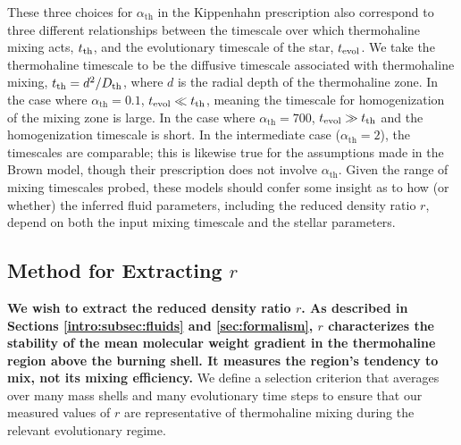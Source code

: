 These three choices for $\alpha_{\text{th}}$ in the Kippenhahn prescription also correspond to three different relationships between the timescale over which thermohaline mixing acts, $t_{\rm th}$, and the evolutionary timescale of the star, $t_{\rm{evol}}$. 
We take the thermohaline timescale to be the diffusive timescale associated with thermohaline mixing, $t_{\rm th} = d^2/D_{\rm th}$, where $d$ is the radial depth of the thermohaline zone.
In the case where $\alpha_{\text{th}} = 0.1$, 
$t_{\rm evol} \ll t_{\rm th}$, meaning the timescale for homogenization of the mixing zone is large. In the case where $\alpha_{\text{th}} = 700$, 
$t_{\rm evol} \gg t_{\rm th}$ and the homogenization timescale is short. In the intermediate case ($\alpha_{\text{th}}= 2$), the timescales are comparable; this is likewise true for the assumptions made in the Brown model, though their prescription does not involve $\alpha_{\text{th}}$. 
%
Given the range of mixing timescales probed, these models should confer some insight as to how (or whether) the inferred fluid parameters, including the reduced density ratio $r$, depend on both the input mixing timescale and the stellar parameters.


\subsection{Method for Extracting $r$}
%
\textbf{We wish to extract the reduced density ratio $r$. As described in Sections \ref{intro:subsec:fluids} and \ref{sec:formalism}, $r$ characterizes the stability of the mean molecular weight gradient in the thermohaline region above the burning shell. It measures the region's tendency to mix, not its mixing efficiency.}
We define a selection criterion that averages over many mass shells and many evolutionary time steps to ensure that our measured values of $r$ are representative of thermohaline mixing during the relevant evolutionary regime.

